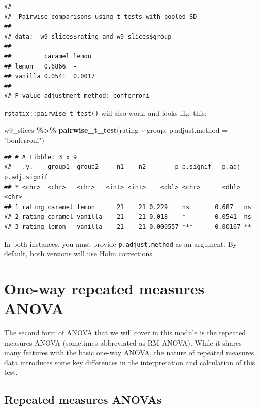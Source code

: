 \documentclass[
]{book}
\newenvironment{Shaded}{\begin{snugshade}}{\end{snugshade}}
\newcommand{\AttributeTok}[1]{\textcolor[rgb]{0.13,0.29,0.53}{#1}}
\newcommand{\FunctionTok}[1]{\textcolor[rgb]{0.13,0.29,0.53}{\textbf{#1}}}
\newcommand{\NormalTok}[1]{#1}
\newcommand{\SpecialCharTok}[1]{\textcolor[rgb]{0.81,0.36,0.00}{\textbf{#1}}}
\newcommand{\StringTok}[1]{\textcolor[rgb]{0.31,0.60,0.02}{#1}}
\begin{document}
\begin{verbatim}
## 
##  Pairwise comparisons using t tests with pooled SD 
## 
## data:  w9_slices$rating and w9_slices$group 
## 
##         caramel lemon 
## lemon   0.6866  -     
## vanilla 0.0541  0.0017
## 
## P value adjustment method: bonferroni
\end{verbatim}

\texttt{rstatix::pairwise\_t\_test()} will also work, and looks like this:

\begin{Shaded}
\begin{Highlighting}[]
\NormalTok{w9\_slices }\SpecialCharTok{\%\textgreater{}\%}
  \FunctionTok{pairwise\_t\_test}\NormalTok{(rating }\SpecialCharTok{\textasciitilde{}}\NormalTok{ group, }\AttributeTok{p.adjust.method =} \StringTok{"bonferroni"}\NormalTok{)}
\end{Highlighting}
\end{Shaded}

\begin{verbatim}
## # A tibble: 3 x 9
##   .y.    group1  group2     n1    n2        p p.signif   p.adj p.adj.signif
## * <chr>  <chr>   <chr>   <int> <int>    <dbl> <chr>      <dbl> <chr>       
## 1 rating caramel lemon      21    21 0.229    ns       0.687   ns          
## 2 rating caramel vanilla    21    21 0.018    *        0.0541  ns          
## 3 rating lemon   vanilla    21    21 0.000557 ***      0.00167 **
\end{verbatim}

In both instances, you must provide \texttt{p.adjust.method} as an argument. By default, both versions will use Holm corrections.

\section{One-way repeated measures ANOVA}\label{one-way-repeated-measures-anova}

The second form of ANOVA that we will cover in this module is the repeated measures ANOVA (sometimes abbreviated as RM-ANOVA). While it shares many features with the basic one-way ANOVA, the nature of repeated measures data introduces some key differences in the interpretation and calculation of this test.

\subsection{Repeated measures ANOVAs}\label{repeated-measures-anovas}
\end{document}
